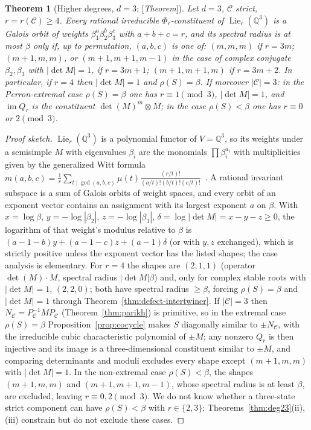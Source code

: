 \documentclass[11pt]{amsart}
\theoremstyle{plain}
\newtheorem{theorem}{Theorem}[section]
\theoremstyle{definition}
\theoremstyle{remark}
\newcommand{\Q}{\mathbb{Q}}
\newcommand{\cC}{\mathcal{C}}
\newcommand{\Lie}{\operatorname{Lie}}
\newcommand{\Status}[1]{\textup{[\textit{#1}]}}
\begin{document}
\begin{theorem}[Higher degrees, $d=3$; \Status{Theorem}]\label{thm:sieve}
Let $d=3$, $\cC$ strict, $r=r(\cC)\ge4$. Every rational irreducible $\Phi_r$-constituent of $\Lie_r(\Q^3)$ is a Galois orbit of weights $\beta_1^{a}\beta_2^{b}\beta_3^{c}$ with $a+b+c=r$, and its spectral radius is at most $\beta$ only if, up to permutation, $(a,b,c)$ is one of: $(m,m,m)$ if $r=3m$; $(m+1,m,m)$, or $(m+1,m+1,m-1)$ in the case of complex conjugate $\beta_2,\beta_3$ with $|\det M|=1$, if $r=3m+1$; $(m+1,m+1,m)$ if $r=3m+2$. In particular, if $r=4$ then $|\det M|=1$ and $\rho(S)=\beta$. If moreover $|\cC|=3$: in the Perron-extremal case $\rho(S)=\beta$ one has $r\equiv1\pmod3$, $|\det M|=1$, and $\operatorname{im}Q_r$ is the constituent $\det(M)^m\otimes M$; in the case $\rho(S)<\beta$ one has $r\equiv0$ or $2\pmod3$.
\end{theorem}
\begin{proof}[Proof sketch]
$\Lie_r(\Q^3)$ is a polynomial functor of $V=\Q^3$, so its weights under a semisimple $M$ with eigenvalues $\beta_i$ are the monomials $\prod\beta_i^{a_i}$ with multiplicities given by the generalized Witt formula $m(a,b,c)=\frac1r\sum_{t\mid\gcd(a,b,c)}\mu(t)\frac{(r/t)!}{(a/t)!(b/t)!(c/t)!}$~\cite[Cor.~4.15]{Reutenauer}. A rational invariant subspace is a sum of Galois orbits of weight spaces, and every orbit of an exponent vector contains an assignment with its largest exponent $a$ on $\beta$. With $x=\log\beta$, $y=-\log|\beta_2|$, $z=-\log|\beta_3|$, $\delta=\log|\det M|=x-y-z\ge0$, the logarithm of that weight's modulus relative to $\beta$ is $(a-1-b)y+(a-1-c)z+(a-1)\delta$ (or with $y,z$ exchanged), which is strictly positive unless the exponent vector has the listed shapes; the case analysis is elementary. For $r=4$ the shapes are $(2,1,1)$ (operator $\det(M)\cdot M$, spectral radius $|\det M|\beta$) and, only for complex stable roots with $|\det M|=1$, $(2,2,0)$; both have spectral radius $\ge\beta$, forcing $\rho(S)=\beta$ and $|\det M|=1$ through Theorem~\ref{thm:defect-intertwiner}. If $|\cC|=3$ then $N_\cC=P_\cC^{-1}MP_\cC$ (Theorem~\ref{thm:parikh}) is primitive, so in the extremal case $\rho(S)=\beta$ Proposition~\ref{prop:cocycle} makes $S$ diagonally similar to $\pm N_\cC$, with the irreducible cubic characteristic polynomial of $\pm M$; any nonzero $Q_r$ is then injective and its image is a three-dimensional constituent similar to $\pm M$, and comparing determinants and moduli excludes every shape except $(m+1,m,m)$ with $|\det M|=1$. In the non-extremal case $\rho(S)<\beta$, the shapes $(m+1,m,m)$ and $(m+1,m+1,m-1)$, whose spectral radius is at least $\beta$, are excluded, leaving $r\equiv0,2\pmod3$. We do not know whether a three-state strict component can have $\rho(S)<\beta$ with $r\in\{2,3\}$; Theorems~\ref{thm:deg23}(ii),(iii) constrain but do not exclude these cases.
\end{proof}
\end{document}
